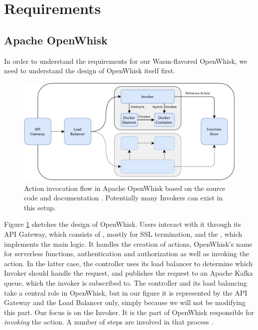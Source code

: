 \section{Requirements}

\subsection{Apache OpenWhisk}

In order to understand the requirements for our Wasm-flavored OpenWhisk, we need to understand the design of OpenWhisk itself first.

\begin{figure}
    \includegraphics{figures/OpenWhiskActionInvocationFlow.pdf}
    \caption{Action invocation flow in Apache OpenWhisk based on the source code and documentation \cite{OpenWhiskSystemDesign}. Potentially many Invokers can exist in this setup.}
    \label{fig:openwhisk-action-invocation-flow}
\end{figure}

Figure \ref{fig:openwhisk-action-invocation-flow} sketches the design of OpenWhisk. Users interact with it through its API Gateway, which consists of , mostly for SSL termination, and the , which implements the main logic. It handles the creation of actions, OpenWhisk's name for serverless functions, authentication and authorization as well as invoking the action.
In the latter case, the controller uses its load balancer to determine which Invoker should handle the request, and publishes the request to an Apache Kafka queue, which the invoker is subscribed to. The controller and its load balancing take a central role in OpenWhisk, but in our figure it is represented by the API Gateway and the Load Balancer only, simply because we will not be modifying this part.
Our focus is on the Invoker. It is the part of OpenWhisk responsible for \emph{invoking} the action. A number of steps are involved in that process \cite{OpenWhiskSystemDesign}.


